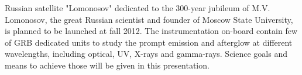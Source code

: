 


\bigskip



\bigskip

\noindent Russian satellite "Lomonosov" dedicated to the 300-year jubileum of M.V. Lomonosov, the great Russian scientist and founder of Moscow State University, is planned to be launched at fall 2012. The instrumentation on-board contain few of GRB dedicated units to study the prompt emission and afterglow at different wavelengths, including optical, UV, X-rays and gamma-rays. Science goals and means to achieve those will be given in this presentation.

